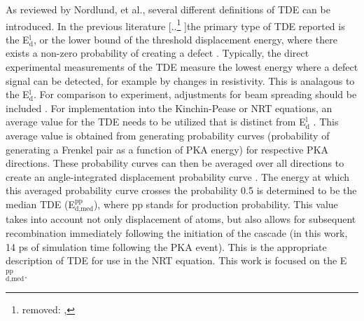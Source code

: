 \documentclass[review]{elsarticle}
\providecommand{\DIFaddtex}[1]{{\protect\color{blue} \sf #1}} %
\providecommand{\DIFdeltex}[1]{{\protect\color{red} [..\footnote{removed: #1} ]}} %
\providecommand{\DIFaddbegin}{} %
\providecommand{\DIFaddend}{} %
\providecommand{\DIFdelbegin}{} %
\providecommand{\DIFdelend}{} %
\providecommand{\DIFadd}[1]{\texorpdfstring{\DIFaddtex{#1}}{#1}} %
\providecommand{\DIFdel}[1]{\texorpdfstring{\DIFdeltex{#1}}{}} %
\newcommand{\DIFscaledelfig}{0.5}
\newlength{\DIFdelgraphicswidth} %
\newlength{\DIFdelgraphicsheight} %
\newcommand{\DIFaddincludegraphics}[2][]{{\color{blue}\fbox{\DIFOincludegraphics[#1]{#2}}}} %
\newcommand{\DIFdelincludegraphics}[2][]{%
\sbox{\DIFdelgraphicsbox}{\DIFOincludegraphics[#1]{#2}}%
\settoboxwidth{\DIFdelgraphicswidth}{\DIFdelgraphicsbox} %
\settoboxtotalheight{\DIFdelgraphicsheight}{\DIFdelgraphicsbox} %
\scalebox{\DIFscaledelfig}{%
\parbox[b]{\DIFdelgraphicswidth}{\usebox{\DIFdelgraphicsbox}\\[-\baselineskip] \rule{\DIFdelgraphicswidth}{0em}}\llap{\resizebox{\DIFdelgraphicswidth}{\DIFdelgraphicsheight}{%
\setlength{\unitlength}{\DIFdelgraphicswidth}%
\begin{picture}(1,1)%
\thicklines\linethickness{2pt} %
{\color[rgb]{1,0,0}\put(0,0){\framebox(1,1){}}}%
{\color[rgb]{1,0,0}\put(0,0){\line( 1,1){1}}}%
{\color[rgb]{1,0,0}\put(0,1){\line(1,-1){1}}}%
\end{picture}%
}\hspace*{3pt}}} %
} %
\DeclareRobustCommand{\DIFaddbegin}{\DIFOaddbegin \let\includegraphics\DIFaddincludegraphics} %
\DeclareRobustCommand{\DIFaddend}{\DIFOaddend \let\includegraphics\DIFOincludegraphics} %
\DeclareRobustCommand{\DIFdelbegin}{\DIFOdelbegin \let\includegraphics\DIFdelincludegraphics} %
\DeclareRobustCommand{\DIFdelend}{\DIFOaddend \let\includegraphics\DIFOincludegraphics} %
\begin{document}
\FloatBarrier

As reviewed by Nordlund, et al.\cite{nordlund2006}, several different definitions of TDE can be introduced. In the previous literature \DIFdelbegin \DIFdel{, }\DIFdelend the primary type of TDE reported is the E$^{\textrm{l}}_{\textrm{d}}$, or the lower bound of the \DIFaddbegin \DIFadd{threshold }\DIFaddend displacement energy, where there exists a non-zero probability of creating a defect \cite{malerba2002}. Typically, the direct experimental measurements of the TDE measure the lowest energy where a defect signal can be detected, for example by changes in resistivity. This is analagous to the E$^{\textrm{l}}_{\textrm{d}}$. For comparison to experiment, adjustments for beam spreading should be included \cite{nordlund2006}. For implementation into the Kinchin-Pease or NRT equations, an average value for the TDE needs to be utilized that is distinct from E$^{\textrm{l}}_{\textrm{d}}$ \cite{nordlund2006,norgett1975}. This average value is obtained from generating probability curves (probability of generating a Frenkel pair as a function of PKA energy) for respective PKA directions. These probability curves can then be averaged over all directions to create an angle-integrated displacement probability curve \cite{nordlund2006}. The energy at which this averaged probability curve crosses the probability 0.5 is determined to be the median TDE (E$^{\textrm{pp}}_{\textrm{d,med}}$), where pp stands for production probability. This value takes into account not only displacement of atoms, but \DIFaddbegin \DIFadd{also }\DIFaddend allows for subsequent recombination immediately following the initiation of the cascade (in this work, 14 ps of simulation time following the PKA event). This is the appropriate description of TDE for use in the NRT equation. This work is focused on the E$^{\textrm{pp}}_{\textrm{d,med}}$.
\end{document}
